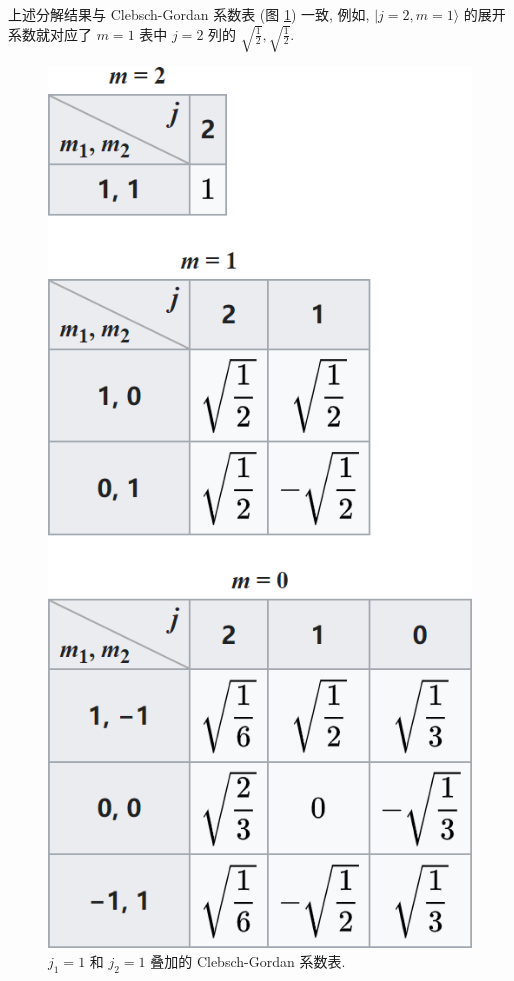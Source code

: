 \documentclass{assignment}
\begin{document}
\begin{sol}
    上述分解结果与 Clebsch-Gordan 系数表 (图 \ref{6-3-fig}) 一致, 例如, $\lvert j=2,m=1\rangle$ 的展开系数就对应了 $m=1$ 表中 $j=2$ 列的 $\sqrt{\frac{1}{2}},\sqrt{\frac{1}{2}}$.
    \begin{figure}[H]
        \centering
        \includegraphics[width=.25\columnwidth]{6-3.png}
        \caption{$j_1=1$ 和 $j_2=1$ 叠加的 Clebsch-Gordan 系数表.}
        \label{6-3-fig}
    \end{figure}
\end{sol}
\end{document}
